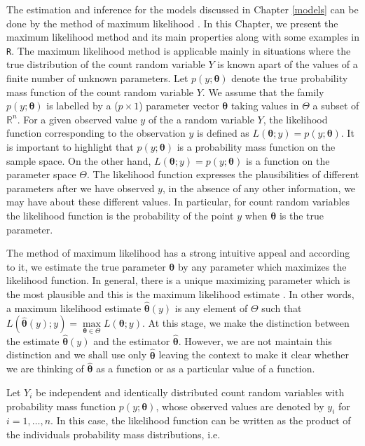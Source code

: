 \documentclass[9pt,a5paper,]{book}
\theoremstyle{definition}
\theoremstyle{definition}
\theoremstyle{remark}
\begin{document}
The estimation and inference for the models discussed in Chapter
\ref{models} can be done by the method of maximum likelihood
\citep{Silvey:1975}. In this Chapter, we present the maximum likelihood
method and its main properties along with some examples in \texttt{R}.
The maximum likelihood method is applicable mainly in situations where
the true distribution of the count random variable \(Y\) is known apart
of the values of a finite number of unknown parameters. Let
\(p(y;\boldsymbol{\theta})\) denote the true probability mass function
of the count random variable \(Y\). We assume that the family
\(p(y;\boldsymbol{\theta})\) is labelled by a (\(p \times 1\)) parameter
vector \(\boldsymbol{\theta}\) taking values in \(\Theta\) a subset of
\(\mathbb{R}^n\). For a given observed value \(y\) of the a random
variable \(Y\), the likelihood function corresponding to the observation
\(y\) is defined as
\(L(\boldsymbol{\theta};y) = p(y;\boldsymbol{\theta})\). It is important
to highlight that \(p(y;\boldsymbol{\theta})\) is a probability mass
function on the sample space. On the other hand,
\(L(\boldsymbol{\theta};y) = p(y;\boldsymbol{\theta})\) is a function on
the parameter space \(\Theta\). The likelihood function expresses the
plausibilities of different parameters after we have observed \(y\), in
the absence of any other information, we may have about these different
values. In particular, for count random variables the likelihood
function is the probability of the point \(y\) when
\(\boldsymbol{\theta}\) is the true parameter.

The method of maximum likelihood has a strong intuitive appeal and
according to it, we estimate the true parameter \(\boldsymbol{\theta}\)
by any parameter which maximizes the likelihood function. In general,
there is a unique maximizing parameter which is the most plausible and
this is the maximum likelihood estimate \citep{Silvey:1975}. In other
words, a maximum likelihood estimate \(\hat{\boldsymbol{\theta}}(y)\) is
any element of \(\Theta\) such that
\(L(\hat{\boldsymbol{\theta}}(y);y) = \underset{\boldsymbol{\theta}\in \Theta}\max L(\boldsymbol{\theta};y).\)
At this stage, we make the distinction between the estimate
\(\hat{\boldsymbol{\theta}}(y)\) and the estimator
\(\hat{\boldsymbol{\theta}}\). However, we are not maintain this
distinction and we shall use only \(\hat{\boldsymbol{\theta}}\) leaving
the context to make it clear whether we are thinking of
\(\hat{\boldsymbol{\theta}}\) as a function or as a particular value of
a function.

Let \(Y_i\) be independent and identically distributed count random
variables with probability mass function \(p(y;\boldsymbol{\theta})\),
whose observed values are denoted by \(y_i\) for \(i = 1, \ldots, n.\)
In this case, the likelihood function can be written as the product of
the individuals probability mass distributions, i.e.
\end{document}
